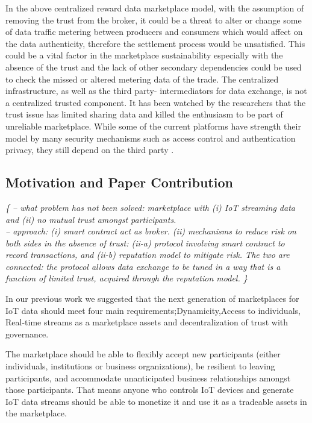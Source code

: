 \documentclass[letterpaper, 10 pt, conference]{ieeeconf}  %
\newcommand{\anote}[1]{{\leavevmode\smaller\itshape\color{red}\{#1\}}}
\begin{document}
In the above centralized reward data marketplace model, with the assumption of removing the trust from the broker, it could be a threat to alter or change some of data traffic metering between producers and consumers which would affect on the data authenticity, therefore the settlement process would be unsatisfied. This could be a vital factor in the marketplace sustainability especially with the absence of the trust and the lack of other secondary dependencies could be used to check the missed or altered metering data of the trade.
The centralized infrastructure, as well as the third party- intermediators for data exchange, is not a centralized trusted component. It has been watched by the researchers that the trust issue has limited sharing data and killed the enthusiasm to be part of unreliable marketplace. While some of the current platforms have strength their model by many security mechanisms such as access control and authentication privacy, they still depend on the third party \cite{12}.

\subsection{Motivation and Paper Contribution} \label{Motivation&Contribution}

\anote{
-- what problem has not been solved: marketplace with (i) IoT streaming data and (ii) no mutual trust amongst participants. \\
-- approach: (i) smart contract act as broker. (ii) mechanisms to reduce risk on both sides in the absence of trust: (ii-a) protocol involving smart contract to record transactions, and (ii-b) reputation model to mitigate risk. The two are connected: the protocol allows data exchange to be tuned in a way that is a function of limited trust, acquired through the reputation model.
}


In our previous work\cite{Missier2017} we suggested that the next generation of marketplaces for IoT data  should meet four main requirements;Dynamicity,Access to individuals, Real-time streams as a marketplace assets and decentralization of trust with governance.

 The marketplace should be able to flexibly accept new participants (either individuals, institutions or business organizations), be resilient to leaving participants, and accommodate unanticipated business relationships amongst those participants. That means anyone who controls IoT devices and generate IoT data streams should be able to monetize it and use it as a tradeable assets in the marketplace.
 
\end{document}

